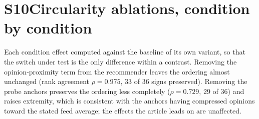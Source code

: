 \documentclass[11pt]{article}
\begin{document}
\medskip

\section*{S10\quad Circularity ablations, condition by condition}
Each condition effect computed against the baseline of its own variant, so that the switch under test is the only difference within a contrast. Removing the opinion-proximity term from the recommender leaves the ordering almost unchanged (rank agreement $\rho = 0.975$, 33 of 36 signs preserved). Removing the probe anchors preserves the ordering less completely ($\rho = 0.729$, 29 of 36) and raises extremity, which is consistent with the anchors having compressed opinions toward the stated feed average; the effects the article leads on are unaffected.
\scriptsize
\setlength{\tabcolsep}{2.5pt}
\end{document}
